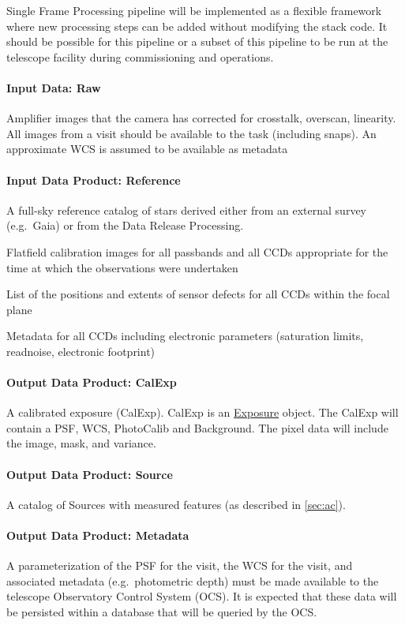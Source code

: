 Single Frame Processing pipeline will be implemented as a flexible   framework where new processing steps can be added without modifying the stack code. It should be possible for this pipeline or a subset of this pipeline  to be run at the telescope facility during commissioning and operations.  

\paragraph{Input Data: Raw}

Amplifier images that the camera has corrected for crosstalk, overscan, linearity.  All images from a visit should be available to the task (including snaps). An approximate WCS is assumed to be available as metadata

\paragraph{Input Data Product: Reference}

A full-sky reference catalog of stars derived either from an external survey (e.g.\ Gaia) or from the Data Release Processing.

Flatfield calibration images for all passbands and all CCDs appropriate for the time at which the observations were undertaken

List of the positions and extents of sensor defects for all CCDs within the focal plane

Metadata for all CCDs including electronic parameters (saturation limits, readnoise, electronic footprint)

\paragraph{Output Data Product: CalExp}

A calibrated exposure (CalExp).  CalExp is an \hyperref[sec:spImagesExposure]{Exposure} object. The CalExp will contain a PSF, WCS, PhotoCalib and Background. The pixel data will include the image, mask, and variance. 

\paragraph{Output Data Product: Source}

A catalog of Sources with measured features (as described in \ref{sec:ac}). 


\paragraph{Output Data Product: Metadata}
A parameterization of the PSF for the visit, the WCS for the visit,
and associated metadata (e.g.\ photometric depth) must be made
available to the telescope Observatory Control System (OCS). It is
expected that these data will be persisted within a database that will
be queried by the OCS.


